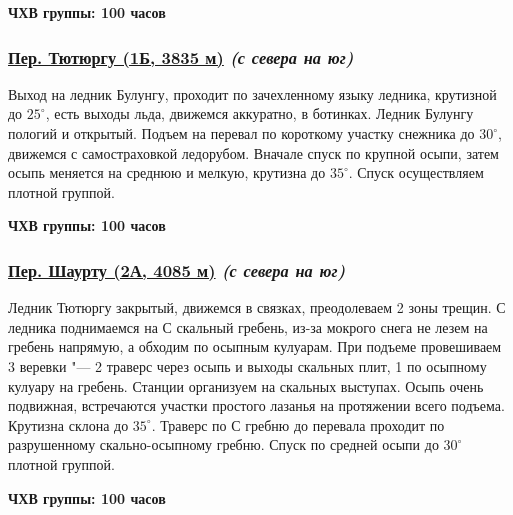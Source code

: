 			{\bf ЧХВ группы: 100 часов}

		\subsubsection*{%
			\hyperref[subsec:Day12]{Пер. Тютюргу (1Б, 3835 м)}
			{\it (с севера на юг)}%
		}
			Выход на ледник Булунгу, проходит по зачехленному языку ледника, крутизной до $25^\circ$, есть выходы
			льда, движемся аккуратно, в ботинках. Ледник Булунгу пологий и открытый. Подъем на перевал по короткому
			участку снежника до $30^\circ$, движемся с самостраховкой ледорубом. Вначале спуск по крупной осыпи,
			затем осыпь меняется на среднюю и мелкую, крутизна до $35^\circ$. Спуск осуществляем плотной группой.
		
			{\bf ЧХВ группы: 100 часов}

		\subsubsection*{%
			\hyperref[subsec:Day12]{Пер. Шаурту (2А, 4085 м)}
			{\it (с севера на юг)}%
		}
			Ледник Тютюргу закрытый, движемся в связках, преодолеваем 2 зоны трещин. С ледника поднимаемся на С
			скальный гребень, из-за мокрого снега не лезем на гребень напрямую, а обходим по осыпным кулуарам.
			При подъеме провешиваем 3 веревки "--- 2 траверс через осыпь и выходы скальных плит, 1 по осыпному кулуару
			на гребень. Станции организуем на скальных выступах. Осыпь очень подвижная, встречаются участки простого
			лазанья на протяжении всего подъема. Крутизна склона до $35^\circ$. Траверс по С гребню до перевала
			проходит по разрушенному скально-осыпному гребню. Спуск по средней осыпи до $30^\circ$ плотной группой.
		
			{\bf ЧХВ группы: 100 часов}


